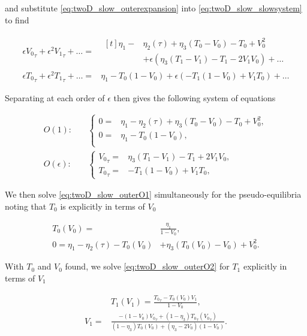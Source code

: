 and substitute \eqref{eq:twoD_slow_outerexpansion} into \eqref{eq:twoD_slow_slowsystem} to find

\begin{equation*}
\begin{aligned}
 \epsilon{V_0}_\tau+\epsilon^2{V_1}_\tau+\ldots =&\begin{aligned}[t]
\eta_1-&\eta_2(\tau)+\eta_3(T_0-V_0)-T_0+V_0^2\\
&+\epsilon(\eta_3(T_1-V_1)-T_1-2V_1V_0)+\ldots
\end{aligned}\\
\epsilon{T_0}_\tau+\epsilon^2{T_1}_\tau+\ldots=&\eta_1-T_0(1-V_0)+\epsilon(-T_1(1-V_0)+V_1T_0)+\ldots
\end{aligned}
\end{equation*}

Separating at each order of $\epsilon$ then gives the following system of equations

\begin{align}
\label{eq:twoD_slow_outerO1}
O(1):\quad & \begin{cases}
	0 =& \eta_1-\eta_2(\tau)+\eta_3(T_0-V_0)-T_0+V_0^2 , \\
	0 =& \eta_1-T_0(1-V_0),\\
\end{cases}\\
\label{eq:twoD_slow_outerO2}
O(\epsilon):\quad & \begin{cases}
	{V_0}_\tau = & \eta_3(T_1-V_1)-T_1+2V_1V_0,\\
	{T_0}_\tau =& -T_1(1-V_0)+V_1T_0,
\end{cases}
\end{align}

We then solve \eqref{eq:twoD_slow_outerO1} simultaneously for the pseudo-equilibria noting that $T_0$ is explicitly in terms of $V_0$ 

\begin{equation}\label{eq:twoD_slow_equilibria}
\begin{aligned}
T_0(V_0)=&\frac{\eta_1}{1-V_0},\\
0=\eta_1-\eta_2(\tau)-T_0(V_0)&+\eta_3(T_0(V_0)-V_0)+V_0^2.
\end{aligned}
\end{equation}

With $T_0$ and $V_0$ found, we solve \eqref{eq:twoD_slow_outerO2} for $T_1$ explicitly in terms of $V_1$ 

\begin{equation}\label{eq:twoD_slow_equilcorrec}
\begin{aligned}
&T_1(V_1) = \frac{{T_0}_\tau-T_0(V_0)V_1}{1-V_0},\\
V_1 =& \frac{-(1-V_0){V_0}_\tau+(1-\eta_3){T_0}_\tau({V_0}_\tau)}{(1-\eta_3)T_0(V_0)+(\eta_3-2V_0)(1-V_0)}.
\end{aligned}
\end{equation}

